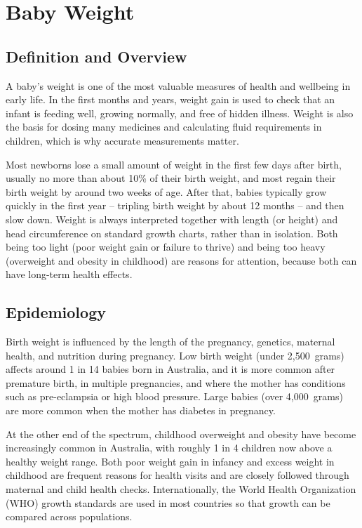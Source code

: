 \chapter{Baby Weight}

\section*{Definition and Overview}
A baby's weight is one of the most valuable measures of health and wellbeing in early life. In the first months and years, weight gain is used to check that an infant is feeding well, growing normally, and free of hidden illness. Weight is also the basis for dosing many medicines and calculating fluid requirements in children, which is why accurate measurements matter.

Most newborns lose a small amount of weight in the first few days after birth, usually no more than about 10\% of their birth weight, and most regain their birth weight by around two weeks of age. After that, babies typically grow quickly in the first year -- tripling birth weight by about 12 months -- and then slow down. Weight is always interpreted together with length (or height) and head circumference on standard growth charts, rather than in isolation. Both being too light (poor weight gain or failure to thrive) and being too heavy (overweight and obesity in childhood) are reasons for attention, because both can have long-term health effects.

\section*{Epidemiology}
Birth weight is influenced by the length of the pregnancy, genetics, maternal health, and nutrition during pregnancy. Low birth weight (under 2,500~grams) affects around 1 in 14 babies born in Australia, and it is more common after premature birth, in multiple pregnancies, and where the mother has conditions such as pre-eclampsia or high blood pressure. Large babies (over 4,000~grams) are more common when the mother has diabetes in pregnancy.

At the other end of the spectrum, childhood overweight and obesity have become increasingly common in Australia, with roughly 1 in 4 children now above a healthy weight range. Both poor weight gain in infancy and excess weight in childhood are frequent reasons for health visits and are closely followed through maternal and child health checks. Internationally, the World Health Organization (WHO) growth standards are used in most countries so that growth can be compared across populations.

